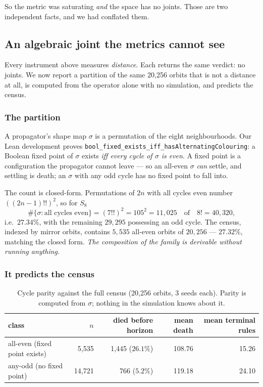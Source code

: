\documentclass[man,12pt,floatsintext]{apa7}
\begin{document}
So the metric was saturating \emph{and} the space has no joints. Those are
two independent facts, and we had conflated them.

\subsection{An algebraic joint the metrics cannot see}
\label{sec:parity}

Every instrument above measures \emph{distance}. Each returns the same verdict:
no joints. We now report a partition of the same 20{,}256 orbits that is not a
distance at all, is computed from the operator alone with no simulation, and
predicts the census.

\subsubsection{The partition}

A propagator's shape map $\sigma$ is a permutation of the eight neighbourhoods.
Our Lean development proves
\texttt{bool\_fixed\_exists\_iff\_hasAlternatingColouring}: a Boolean fixed
point of $\sigma$ exists \emph{iff every cycle of $\sigma$ is even}. A fixed
point is a configuration the propagator cannot leave --- so an all-even $\sigma$
\emph{can} settle, and settling is death; an $\sigma$ with any odd cycle has no
fixed point to fall into.

The count is closed-form. Permutations of $2n$ with all cycles even number
$((2n-1)!!)^2$, so for $S_8$
\[
  \#\{\sigma : \text{all cycles even}\} = (7!!)^2 = 105^2 = 11{,}025
  \quad\text{of}\quad 8! = 40{,}320,
\]
i.e.\ $27.34\%$, with the remaining $29{,}295$ possessing an odd cycle. The
census, indexed by mirror orbits, contains $5{,}535$ all-even orbits of
$20{,}256$ --- $27.32\%$, matching the closed form. \emph{The composition of the
family is derivable without running anything.}

\subsubsection{It predicts the census}

\begin{table}[htbp]
  \centering
  \caption{Cycle parity against the full census (20{,}256 orbits, 3 seeds each).
  Parity is computed from $\sigma$; nothing in the simulation knows about it.}
  \label{tab:parity}
  \begin{tabular}{lrrrr}
    \toprule
    class & $n$ & died before horizon & mean death & mean terminal rules \\
    \midrule
    all-even (fixed point exists) & 5{,}535 & 1{,}445 ($26.1\%$) & 108.76 & 15.26 \\
    any-odd (no fixed point)      & 14{,}721 & 766 ($5.2\%$)     & 119.18 & 24.10 \\
    \bottomrule
  \end{tabular}
\end{table}
\end{document}
